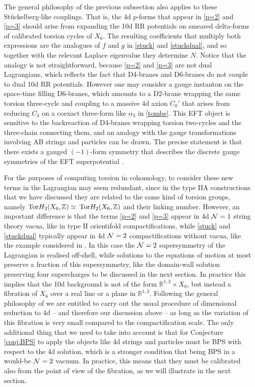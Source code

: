 \documentclass[11pt]{article}
\def\a {\alpha}
\def\CN {{\cal N}}
\newcommand{\IR}{\mathbb{R}}
\newcommand{\IZ}{\mathbb{Z}}
\begin{document}
The general philosophy of the previous subsection also applies to these St\"uckelberg-like couplings. That is, the 4d $p$-forms that appear in \eqref{p=2} and \eqref{p=3} should arise from expanding the 10d RR potentials on smeared delta-forms of calibrated torsion cycles of $X_6$. The resulting coefficients that multiply both expressions are the analogues of $f$ and $g$ in \eqref{stuck} and \eqref{stuckdual}, and so together with the relevant Laplace eigenvalue they determine $N$. Notice that the analogy is not straightforward, because  \eqref{p=2} and \eqref{p=3}  are not dual Lagrangians, which reflects the fact that D4-branes and D6-branes do not couple to dual 10d RR potentials. However one may consider a gauge instanton on the space-time filling D6-branes, which amounts to a D2-brane wrapping the same torsion three-cycle and coupling to a massive 4d axion $C_0'$ that arises from reducing $C_3$ on a coexact three-form like $\a_3$ in \eqref{tombe}. This EFT object is sensitive to the backreaction of D4-branes wrapping torsion two-cycles and the three-chain connecting them, and an analogy with the gauge transformations involving AB strings and particles can be drawn. The precise statement is that there exists a gauged $(-1)$-form symmetry that describes the discrete gauge symmetries of the EFT superpotential \cite{Hebecker:2017wsu,Heidenreich:2020pkc}. 

For the purposes of computing torsion in cohomology,  to consider these new terms in the Lagrangian may seem redundant, since in the type IIA constructions that we have discussed they are related to the same kind of torsion groups, namely ${\rm Tor} H_3(X_6, \IZ) \simeq$ ${\rm Tor} H_2(X_6, \IZ)$ and their linking number. However, an important difference is that the terms \eqref{p=2} and \eqref{p=3} appear in 4d $\CN=1$ string theory vacua, like in type II orientifold compactifications, while \eqref{stuck} and \eqref{stuckdual} typically appear in 4d $\CN=2$ compactifications without vacua, like the example considered in \cite{Gurrieri:2002wz}.  In this case the $\CN=2$ supersymmetry of the Lagrangian is realised off-shell, while solutions to the equations of motion at most preserve a fraction of this supersymmetry, like the domain-wall solution preserving four supercharges to be discussed in the next section. In practice this implies that the 10d background is not of the form $\IR^{1,3} \times X_6$, but instead a fibration of $X_6$ over a real line or a plane in $\IR^{1,3}$. Following the general philosophy of \cite{Gurrieri:2002wz,Grana:2005ny} we are entitled to carry out the usual procedure of dimensional reduction to 4d -- and therefore our discussion above -- as long as the variation of this fibration is very small compared to the compactification scale. The only additional thing that we need to take into account is that for Conjecture \ref{conj:BPS} to apply the objects like 4d strings and particles must be BPS with respect to the 4d solution, which is a stronger condition that being BPS in a would-be $\CN=2$ vacuum. In practice, this means that they must be calibrated also from the point of view of the fibration, as we will illustrate in the next section. 
\end{document}
